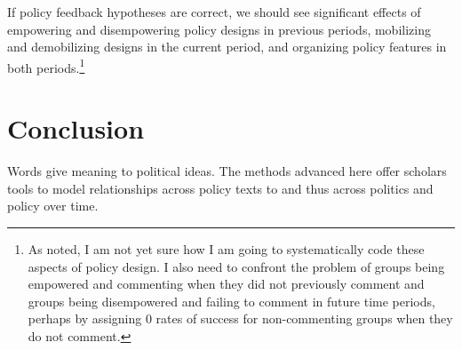 If policy feedback hypotheses are correct, we should see significant effects of empowering and disempowering policy designs in previous periods, mobilizing and demobilizing designs in the current period, and organizing policy features in both periods.\footnote{As noted, I am not yet sure how I am going to systematically code these aspects of policy design. I also need to confront the problem of groups being empowered and commenting when they did not previously comment and groups being disempowered and failing to comment in future time periods, perhaps by assigning 0 rates of success for non-commenting groups when they do not comment.}

\section{Conclusion}

Words give meaning to political ideas. The methods advanced here offer scholars tools to model relationships across policy texts to and thus across politics and policy over time. 

